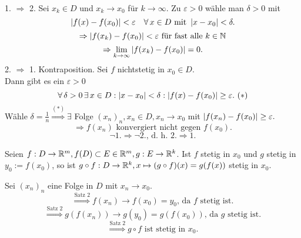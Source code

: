 \documentclass[../ana1.tex]{subfiles}
\begin{document}
\begin{bew}\leavevmode \\
    1. \(\Rightarrow \) 2. Sei \(x_k \in D \) und \( x_k 
    \rightarrow x_0 \) für \( k\rightarrow \infty \).
    Zu \( \varepsilon > 0 \) wähle man \( \delta > 0 \) mit
    \[ \left| f(x) - f(x_0) \right| < \varepsilon \quad \forall \, x\in D 
    \text{ mit } \left|x-x_0\right|<\delta. \]
    \[ \Rightarrow \left| f(x_k) - f(x_0) \right| < \varepsilon
    \text{ für fast alle } k\in\mathbb{N} \]
    \[ \Rightarrow \lim\limits_{k\rightarrow\infty} \left| f(x_k) - f(x_0) \right| = 0. \]
    2. \(\Rightarrow \) 1. Kontraposition. Sei \( f \) nichtstetig
    in \( x_0 \in D \).\\
    Dann gibt es ein \( \varepsilon > 0 \)
    \[ \forall \, \delta > 0 \,\exists \, x\in D : \left|x-x_0\right| 
    < \delta : \left| f(x) - f(x_0) \right| \geq \varepsilon.\ (*) \]
    Wähle \( \delta = \frac{1}{n} \overset{(*)}{\Rightarrow}
    \exists \) Folge \( {(x_n)}_n, x_n \in D, x_n \rightarrow x_0 \)
    mit \( \left| f(x_n) - f(x_0) \right| \geq \varepsilon. \)
    \[ \Rightarrow f(x_n) \text{ konvergiert nicht gegen } f(x_0). \]
    \[ \neg 1. \Rightarrow \neg 2.\text{, d.\ h.\ }2.\Rightarrow 1. \]
\end{bew}
\begin{satz}[Verkettung]
    Seien \( f:D\rightarrow \mathbb{R}^m, f(D) \subset E \in\mathbb{R}^m, 
    g: E\rightarrow\mathbb{R}^k \). Ist \( f \) stetig in \( x_0 \)
    und \( g \) stetig in \( y_0 := f(x_0) \), so ist 
    \( g \circ f : D\rightarrow \mathbb{R}^k, x \mapsto (g\circ f)(x) 
    = g(f(x)) \) stetig in \( x_0 \).
\end{satz}
\begin{bew}
    Sei \( {(x_n)}_n \) eine Folge in \( D \) mit 
    \( x_n \rightarrow x_0 \).
    \[ \overset{\text{Satz 2}}{\Rightarrow} f(x_n) \rightarrow f(x_0)
    = y_0 \text{, da } f \text{ stetig ist.} \]
    \[ \overset{\text{Satz 2}}{\Rightarrow} g(f(x_n))
    \rightarrow g(y_0) = g(f(x_0)) \text{, da } g \text{ stetig ist.} \]
    \[ \overset{\text{Satz 2}}{\Rightarrow} g\circ f 
    \text{ ist stetig in } x_0. \]
\end{bew}
\end{document}
